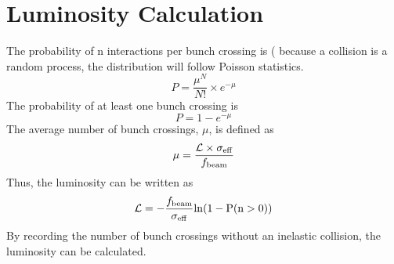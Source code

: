 \chapter{Luminosity Calculation}
\label{lumi} 


The probability of n interactions per bunch crossing is ( because a collision is a random process, the distribution will follow Poisson statistics.
\begin{equation}
P = \frac{\mu^{N}}{N!} \times e^{-\mu}
\end{equation}
The probability of at least one bunch crossing is
\begin{equation}
P = 1 -  e^{-\mu}
\end{equation}
The average number of bunch crossings, $\mu$, is defined as
\begin{equation}
\mu = \frac{\mathcal{L} \times \sigma_{\rm{eff}}}{f_{\rm{beam}}}
\end{equation}
Thus, the luminosity can be written as 
\begin{equation}
\mathcal{L} = - \frac{f_{\rm{beam}}}{\sigma_{\rm{eff}}} \rm{ln}(1-P(n>0))
\end{equation}
By recording the number of bunch crossings without an inelastic collision, the luminosity can be calculated.

